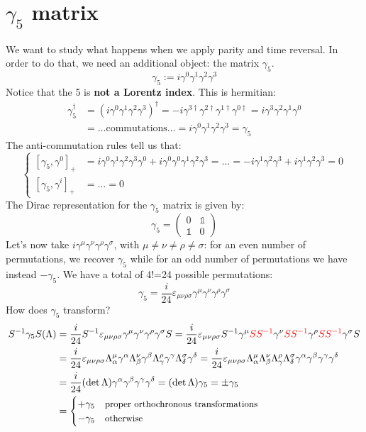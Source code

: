 \documentclass[../main.tex]{subfiles}
\begin{document}
\section{$\gamma_5$ matrix}
We want to study what happens when we apply parity and time reversal. In order to do that, we need an additional object: the matrix $\gamma_5$.
\[
\gamma_5:=i\gamma^0\gamma^1\gamma^2\gamma^3
\]
Notice that the 5 is \textbf{not a Lorentz index}. This is hermitian:
\begin{align*}
\gamma^\dagger_5&=(i\gamma^0\gamma^1\gamma^2\gamma^3)^\dagger=-i\gamma^{3\dagger}\gamma^{2\dagger}\gamma^{1\dagger}\gamma^{0\dagger}=i\gamma^3\gamma^2\gamma^1\gamma^0\\
&=\dots\text{commutations}\dots=i\gamma^0\gamma^1\gamma^2\gamma^3=\gamma_5
\end{align*}
The anti-commutation rules tell us that:
\[
\left\{
\begin{aligned}
[\gamma_5,\gamma^0]_+&=i\gamma^0\gamma^1\gamma^2\gamma^3\gamma^0+i\gamma^0\gamma^0\gamma^1\gamma^2\gamma^3=\dots=-i\gamma^1\gamma^2\gamma^3+i\gamma^1\gamma^2\gamma^3=0\\
[\gamma_5,\gamma^i]_+&=\dots=0
\end{aligned}
\right.
\]
The Dirac representation for the $\gamma_5$ matrix is given by:
\[
\gamma_5=\left(\begin{array}{cc}
    0 & \mathbb{1} \\
    \mathbb{1} & 0
\end{array}\right)
\]
Let's now take $i\gamma^\mu\gamma^\nu\gamma^\rho\gamma^\sigma$, with $\mu\neq\nu\neq\rho\neq\sigma$: for an even number of permutations, we recover $\gamma_5$ while for an odd number of permutations we have instead $-\gamma_5$. We have a total of 4!=24 possible permutations:
\[
\gamma_5=\frac{i}{24}\varepsilon_{\mu\nu\rho\sigma}\gamma^\mu\gamma^\nu\gamma^\rho\gamma^\sigma
\]
How does $\gamma_5$ transform? %
\begin{align*}
S^{-1}\gamma_5S(\Lambda)&=\frac{i}{24}S^{-1}\varepsilon_{\mu\nu\rho\sigma}\gamma^\mu\gamma^\nu\gamma^\rho\gamma^\sigma S=\frac{i}{24}\varepsilon_{\mu\nu\rho\sigma}S^{-1}\gamma^\mu {\color{red}SS^{-1}}\gamma^\nu {\color{red}SS^{-1}}\gamma^\rho {\color{red}SS^{-1}}\gamma^\sigma 
S\\
&=\frac{i}{24}\varepsilon_{\mu\nu\rho\sigma}\Lambda^\mu_\alpha\gamma^\alpha\Lambda^\nu_\beta\gamma^\beta\Lambda^\rho_\gamma\gamma^\gamma\Lambda^\sigma_\delta\gamma^\delta=\frac{i}{24}\varepsilon_{\mu\nu\rho\sigma}\Lambda^\mu_\alpha\Lambda^\nu_\beta\Lambda^\rho_\gamma\Lambda^\sigma_\delta\gamma^\alpha\gamma^\beta\gamma^\gamma\gamma^\delta\\
&=\frac{i}{24}(\det\Lambda)\gamma^\alpha\gamma^\beta\gamma^\gamma\gamma^\delta=(\det\Lambda)\gamma_5=\pm\gamma_5\\
&=\begin{cases}
+\gamma_5 \quad \small\text{proper orthochronous transformations}\\
-\gamma_5 \quad \small\text{otherwise}
\end{cases}
\end{align*}
\end{document}
